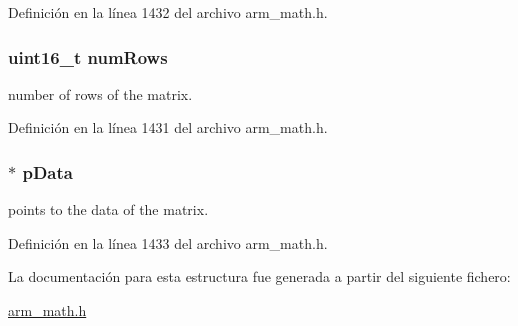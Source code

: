 Definición en la línea 1432 del archivo arm\+\_\+math.\+h.

\subsubsection[{\texorpdfstring{num\+Rows}{numRows}}]{\setlength{\rightskip}{0pt plus 5cm}uint16\+\_\+t num\+Rows}\hypertarget{structarm__matrix__instance__q31_a1bcf80ccdc2acc29198f1592ae300390}{}\label{structarm__matrix__instance__q31_a1bcf80ccdc2acc29198f1592ae300390}
number of rows of the matrix. 

Definición en la línea 1431 del archivo arm\+\_\+math.\+h.

\subsubsection[{\texorpdfstring{p\+Data}{pData}}]{$\ast$ p\+Data}\hypertarget{structarm__matrix__instance__q31_ad296f76577326ff280726323536eed6d}{}\label{structarm__matrix__instance__q31_ad296f76577326ff280726323536eed6d}
points to the data of the matrix. 

Definición en la línea 1433 del archivo arm\+\_\+math.\+h.



La documentación para esta estructura fue generada a partir del siguiente fichero\+:\begin{DoxyCompactItemize}
\item 
\hyperlink{arm__math_8h}{arm\+\_\+math.\+h}\end{DoxyCompactItemize}
